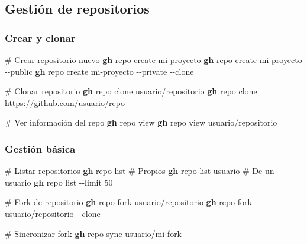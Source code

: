 \documentclass[
  11pt,
  letterpaper,
  oneside,
  openany]{scrbook}
\newenvironment{Shaded}{}{}
\newcommand{\AttributeTok}[1]{\textcolor[rgb]{0.84,0.23,0.29}{#1}}
\newcommand{\CommentTok}[1]{\textcolor[rgb]{0.42,0.45,0.49}{#1}}
\newcommand{\ExtensionTok}[1]{\textcolor[rgb]{0.84,0.23,0.29}{\textbf{#1}}}
\newcommand{\NormalTok}[1]{\textcolor[rgb]{0.14,0.16,0.18}{#1}}
\begin{document}
\subsection{Gestión de repositorios}\label{gestiuxf3n-de-repositorios}

\subsubsection{Crear y clonar}\label{crear-y-clonar}

\begin{Shaded}
\begin{Highlighting}[]
\CommentTok{\# Crear repositorio nuevo}
\ExtensionTok{gh}\NormalTok{ repo create mi{-}proyecto}
\ExtensionTok{gh}\NormalTok{ repo create mi{-}proyecto }\AttributeTok{{-}{-}public}
\ExtensionTok{gh}\NormalTok{ repo create mi{-}proyecto }\AttributeTok{{-}{-}private} \AttributeTok{{-}{-}clone}

\CommentTok{\# Clonar repositorio}
\ExtensionTok{gh}\NormalTok{ repo clone usuario/repositorio}
\ExtensionTok{gh}\NormalTok{ repo clone https://github.com/usuario/repo}

\CommentTok{\# Ver información del repo}
\ExtensionTok{gh}\NormalTok{ repo view}
\ExtensionTok{gh}\NormalTok{ repo view usuario/repositorio}
\end{Highlighting}
\end{Shaded}

\subsubsection{Gestión básica}\label{gestiuxf3n-buxe1sica}

\begin{Shaded}
\begin{Highlighting}[]
\CommentTok{\# Listar repositorios}
\ExtensionTok{gh}\NormalTok{ repo list  }\CommentTok{\# Propios}
\ExtensionTok{gh}\NormalTok{ repo list usuario  }\CommentTok{\# De un usuario}
\ExtensionTok{gh}\NormalTok{ repo list }\AttributeTok{{-}{-}limit}\NormalTok{ 50}

\CommentTok{\# Fork de repositorio}
\ExtensionTok{gh}\NormalTok{ repo fork usuario/repositorio}
\ExtensionTok{gh}\NormalTok{ repo fork usuario/repositorio }\AttributeTok{{-}{-}clone}

\CommentTok{\# Sincronizar fork}
\ExtensionTok{gh}\NormalTok{ repo sync usuario/mi{-}fork}
\end{Highlighting}
\end{Shaded}
\end{document}
